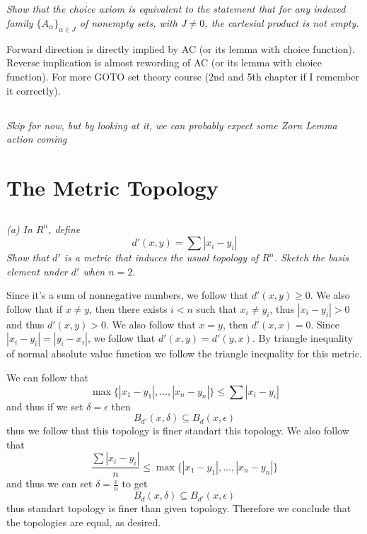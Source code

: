 \documentclass[11pt,oneside,titlepage]{book}
\newcommand{\set}[1]{\{ #1 \}}
\begin{document}
\subsection{}

\textit{Show that the choice axiom is equivalent to the statement that for any indexed family
  $\set{A_\alpha}_{\alpha \in J}$ of nonempty sets, with $J \neq 0$, the cartesial product is
  not empty.}

Forward direction is directly implied by AC (or its lemma with choice function).
Reverse implication is almost rewording of AC (or its lemma with choice function).
For more GOTO set theory course (2nd and 5th chapter if I remember it correctly).

\subsection{}

\textit{Skip for now, but by looking at it, we can probably expect some Zorn Lemma action coming}

\section{The Metric Topology}

\subsection{}

\textit{(a) In $R^n$, define
  $$d'(x, y) = \sum{|x_i - y_i|}$$
  Show that $d'$ is a metric that induces the usual topology of $R^n$. Sketch the basis element
  under $d'$ when $n = 2$. 
}

Since it's a sum of nonnegative numbers, we follow that $d'(x, y) \geq 0$. We also follow that
if $x \neq y$, then there exists  $i < n$ such that $x_i \neq y_i$, thus $|x_i - y_i| > 0$
and thus $d'(x, y) > 0$. We also follow that $x = y$, then $d'(x, x) = 0$.
Since $|x_i - y_i| = |y_i - x_i|$, we follow that $d'(x, y) = d'(y, x)$.
By triangle inequality of normal absolute value function we follow the triangle inequality for
this metric.

We can follow that
$$\max\set{|x_1 - y_1|, ..., |x_n - y_n|} \leq \sum{|x_i - y_i|}$$
and thus if we set $\delta = \epsilon$ then 
$$B_{d'}(x, \delta) \subseteq B_{d}(x, \epsilon)$$
thus we follow that this topology is finer standart this topology.
We also follow that
$$ \frac{\sum{|x_i - y_i|}}{n} \leq \max\set{|x_1 - y_1|, ..., |x_n - y_n|}$$
and thus we can set $\delta = \frac{\epsilon}{n}$ to get
$$B_{d}(x, \delta) \subseteq B_{d'}(x, \epsilon)$$
thus standart topology is finer than given topology. Therefore we conclude that the topologies
are equal, as desired.
\end{document}
